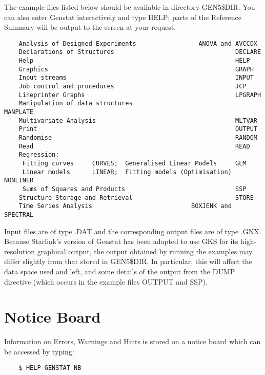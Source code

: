The example files listed below should be available in directory GEN5\$DIR.
You can also enter Genstat interactively and type HELP; parts of the Reference
Summary will be output to the screen at your request.
\begin{verbatim}
    Analysis of Designed Experiments                 ANOVA and AVCCOX
    Declarations of Structures                                 DECLARE
    Help                                                       HELP
    Graphics                                                   GRAPH
    Input streams                                              INPUT
    Job control and procedures                                 JCP
    Lineprinter Graphs                                         LPGRAPH
    Manipulation of data structures                            MANPLATE
    Multivariate Analysis                                      MLTVAR
    Print                                                      OUTPUT
    Randomise                                                  RANDOM
    Read                                                       READ
    Regression:
     Fitting curves     CURVES;  Generalised Linear Models     GLM
     Linear models      LINEAR;  Fitting models (Optimisation) NONLINER
     Sums of Squares and Products                              SSP
    Structure Storage and Retrieval                            STORE
    Time Series Analysis                           BOXJENK and SPECTRAL
\end{verbatim}
Input files are of type .DAT and the corresponding output files are of
type .GNX.
Because Starlink's version of Genstat has been adapted to use GKS for its
high-resolution graphical output, the output obtained by running the
examples may differ slightly from that stored in GEN5\$DIR.
In particular, this will affect the data space used and left, and some
details of the output from the DUMP directive (which occurs in the example
files OUTPUT and SSP).

\section{Notice Board}

Information on Errors, Warnings and Hints is stored on a notice board which
can be accessed by typing:
\begin{verbatim}
    $ HELP GENSTAT NB
\end{verbatim}

                                                                                                                                                                                                                                                                                                                                                                                                                                                                                                                                                                                                                                                                                                                                          